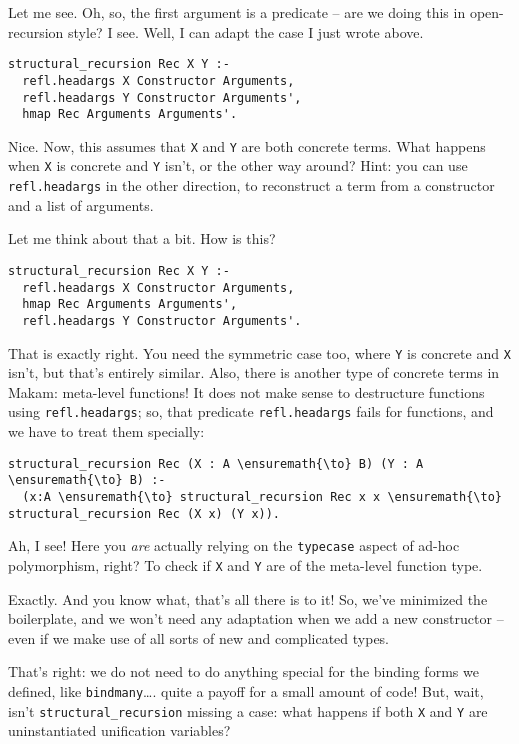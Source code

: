 \heroSTUDENT{} Let me see. Oh, so, the first argument is a predicate -- are we
doing this in open-recursion style? I see. Well, I can adapt the case I
just wrote above.

\begin{verbatim}
structural_recursion Rec X Y :-
  refl.headargs X Constructor Arguments,
  refl.headargs Y Constructor Arguments',
  hmap Rec Arguments Arguments'.
\end{verbatim}

\heroADVISOR{} Nice. Now, this assumes that \texttt{X} and \texttt{Y} are both
concrete terms. What happens when \texttt{X} is concrete and \texttt{Y}
isn't, or the other way around? Hint: you can use \texttt{refl.headargs}
in the other direction, to reconstruct a term from a constructor and a
list of arguments.

\heroSTUDENT{} Let me think about that a bit. How is this?

\begin{verbatim}
structural_recursion Rec X Y :-
  refl.headargs X Constructor Arguments,
  hmap Rec Arguments Arguments',
  refl.headargs Y Constructor Arguments'.
\end{verbatim}

\heroADVISOR{} That is exactly right. You need the symmetric case too, where
\texttt{Y} is concrete and \texttt{X} isn't, but that's entirely
similar. Also, there is another type of concrete terms in Makam:
meta-level functions! It does not make sense to destructure functions
using \texttt{refl.headargs}; so, that predicate \texttt{refl.headargs}
fails for functions, and we have to treat them specially:

\begin{verbatim}
structural_recursion Rec (X : A \ensuremath{\to} B) (Y : A \ensuremath{\to} B) :-
  (x:A \ensuremath{\to} structural_recursion Rec x x \ensuremath{\to} structural_recursion Rec (X x) (Y x)).
\end{verbatim}

\heroSTUDENT{} Ah, I see! Here you \emph{are} actually relying on the
\texttt{typecase} aspect of ad-hoc polymorphism, right? To check if
\texttt{X} and \texttt{Y} are of the meta-level function type.

\heroADVISOR{} Exactly. And you know what, that's all there is to it! So,
we've minimized the boilerplate, and we won't need any adaptation when
we add a new constructor -- even if we make use of all sorts of new and
complicated types.

\heroSTUDENT{} That's right: we do not need to do anything special for the
binding forms we defined, like \texttt{bindmany}\ldots{}. quite a payoff
for a small amount of code! But, wait, isn't
\texttt{structural\_recursion} missing a case: what happens if both
\texttt{X} and \texttt{Y} are uninstantiated unification variables?

